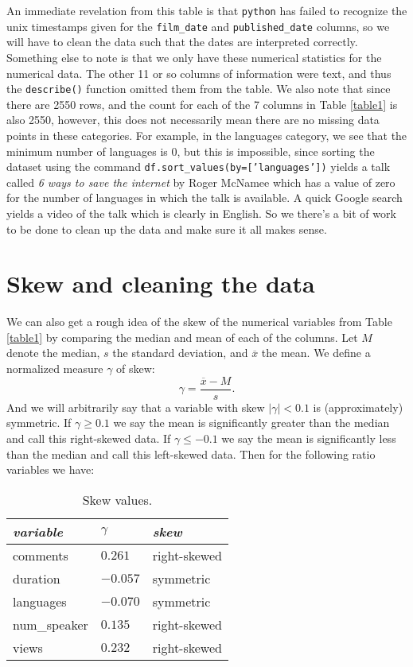 \documentclass[11pt,oneside,reqno]{amsart}
\theoremstyle{plain}
\theoremstyle{definition}
\theoremstyle{remark}
\newcommand{\fracc}{\frac}
\newcommand{\inlinecode}{\texttt}
\newcommand{\ra}[1]{\renewcommand{\arraystretch}{#1}}
\renewcommand{\bar}{\overline}%
\begin{document}
An immediate revelation from this table is that \inlinecode{python} has failed to recognize the unix timestamps given for the \inlinecode{film\_date} and \inlinecode{published\_date} columns, so we will have to clean the data such that the dates are interpreted correctly. Something else to note is that we only have these numerical statistics for the numerical data. The other 11 or so columns of information were text, and thus the \inlinecode{describe()} function omitted them from the table. We also note that since there are 2550 rows, and the count for each of the 7 columns in Table \ref{table1} is also 2550, however, this does not necessarily mean there are no missing data points in these categories. For example, in the languages category, we see that the minimum number of languages is 0, but this is impossible, since sorting the dataset using the command \inlinecode{df.sort\_values(by=['languages'])} yields a talk called \textit{6 ways to save the internet} by Roger McNamee which has a value of zero for the number of languages in which the talk is available. A quick Google search yields a video of the talk which is clearly in English. So we there's a bit of work to be done to clean up the data and make sure it all makes sense. 

\section{Skew and cleaning the data}

We can also get a rough idea of the skew of the numerical variables from Table \ref{table1} by comparing the median and mean of each of the columns. Let $M$ denote the median, $s$ the standard deviation, and $\bar{x}$ the mean. We define a normalized measure $\gamma$ of skew:
$$
\gamma = \fracc{\bar{x} - M}{s}.
$$
And we will arbitrarily say that a variable with skew $|\gamma| < 0.1$ is (approximately) symmetric. If $\gamma \geq 0.1$ we say the mean is significantly greater than the median and call this right-skewed data. If $\gamma \leq -0.1$ we say the mean is significantly less than the median and call this left-skewed data. Then for the following ratio variables we have: 

\begin{table}[H]\label{table2}\centering
\ra{1.2}
\begin{tabular}{@{}lll@{}}\toprule[1.7pt]
\textit{variable}
& \textit{$\gamma$} & \textit{skew}\\
\midrule
comments & $0.261$ & right-skewed\\
duration & $-0.057$ & symmetric\\
languages & $-0.070$ & symmetric\\
num\_speaker & $0.135$ & right-skewed\\
views & $0.232$ & right-skewed\\
\bottomrule[1.7pt]
\end{tabular}
\vspace{1mm}
\caption{Skew values. } 
\end{table}
\end{document}
